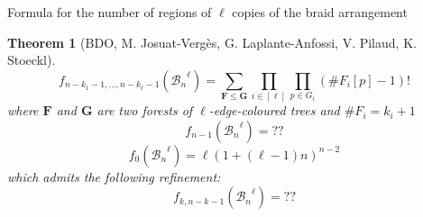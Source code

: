 \documentclass[slidetop,11pt %
]{beamer}
\newtheorem{thm}{Theorem}
\theoremstyle{definition}
\begin{document}
\begin{frame}{Formula for the number of regions of $\ell$ copies of the braid arrangement}

\begin{thm}[BDO, M. Josuat-Vergès, G. Laplante-Anfossi, V. Pilaud, K. Stoeckl]
\begin{equation*}
f_{n-k_1-1,\ldots,  n-k_\ell-1}({\mathcal{B}_n}^\ell)=\sum_{\mathbf{F} \leq \mathbf{G}} \prod_{i \in [\ell]} \prod_{p \in G_i} \left( \# F_i[p]-1\right)!
\end{equation*}
where $\mathbf{F}$ and $\mathbf{G}$ are two forests of $\ell$-edge-coloured trees and $\# F_i = k_i+1$
\begin{equation*}
f_{n-1}({\mathcal{B}_n}^\ell)=??
\end{equation*}
\begin{equation*}
f_{0}({\mathcal{B}_n}^\ell)=\ell\left(1+(\ell-1)n\right)^{n-2}
\end{equation*}
which admits the following refinement:
\begin{equation*}
f_{k, n-k-1}({\mathcal{B}_n}^\ell)=??
\end{equation*}
\end{thm}

\end{frame}
\end{document}
